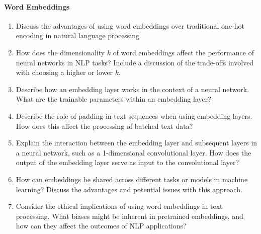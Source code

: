 \paragraph*{Word Embeddings}
\begin{enumerate}
    \item Discuss the advantages of using word embeddings over traditional one-hot encoding in natural language processing.
    \item How does the dimensionality $k$ of word embeddings affect the performance of neural networks in NLP tasks? Include a discussion of the trade-offs involved with choosing a higher or lower $k$.
    \item Describe how an embedding layer works in the context of a neural network. What are the trainable parameters within an embedding layer?
    \item Describe the role of padding in text sequences when using embedding layers. How does this affect the processing of batched text data?
    \item Explain the interaction between the embedding layer and subsequent layers in a neural network, such as a 1-dimensional convolutional layer. How does the output of the embedding layer serve as input to the convolutional layer?
    \item How can embeddings be shared across different tasks or models in machine learning? Discuss the advantages and potential issues with this approach.
    \item Consider the ethical implications of using word embeddings in text processing. What biases might be inherent in pretrained embeddings, and how can they affect the outcomes of NLP applications?
\end{enumerate}
